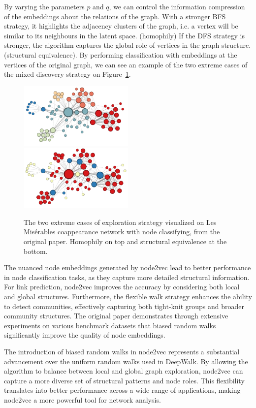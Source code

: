 By varying the parameters $p$ and $q$, we can control the information compression of the embeddings about the relations of the graph. With a stronger BFS strategy, it highlights the adjacency clusters of the graph, i.e. a vertex will be similar to its neighbours in the latent space. (homophily) If the DFS strategy is stronger, the algorithm captures the global role of vertices in the graph structure. (structural equivalence). By performing classification with embeddings at the vertices of the original graph, we can see an example of the two extreme cases of the mixed discovery strategy on Figure~\ref{strategies}.

\begin{figure}[ht!]
	\centering
	\includegraphics[width=0.50\textwidth]{figures/homo}
	\includegraphics[width=0.50\textwidth]{figures/struceq}
	\caption{The two extreme cases of exploration strategy visualized on Les Mis\'{e}rables coappearance network with node classifying, from the original paper.\cite{DBLP:journals/corr/GroverL16} Homophily on top and structural equivalence at the bottom.}
        \label{strategies}
\end{figure}

The nuanced node embeddings generated by node2vec lead to better performance in node classification tasks, as they capture more detailed structural information. For link prediction, node2vec improves the accuracy by considering both local and global structures. Furthermore, the flexible walk strategy enhances the ability to detect communities, effectively capturing both tight-knit groups and broader community structures. The original paper \cite{DBLP:journals/corr/GroverL16} demonstrates through extensive experiments on various benchmark datasets that biased random walks significantly improve the quality of node embeddings. 

The introduction of biased random walks in node2vec represents a substantial advancement over the uniform random walks used in DeepWalk. By allowing the algorithm to balance between local and global graph exploration, node2vec can capture a more diverse set of structural patterns and node roles. This flexibility translates into better performance across a wide range of applications, making node2vec a more powerful tool for network analysis.